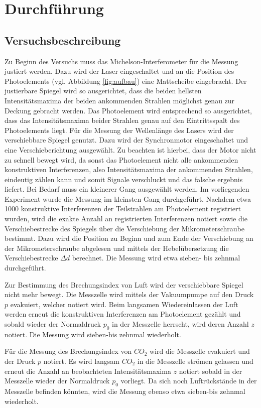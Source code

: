 \section{Durchführung}
\label{sec:Durchführung}



\subsection{Versuchsbeschreibung}
\label{sec:Versuchsbeschreibung}
Zu Beginn des Versuchs muss das Michelson-Interferometer für die Messung justiert werden.
Dazu wird der Laser eingeschaltet und an die Position des Photoelements (vgl. Abbildung \ref{fig:aufbau}) eine Mattscheibe eingebracht.
Der justierbare Spiegel wird so ausgerichtet, dass die beiden hellsten Intensitätsmaxima der beiden ankommenden Strahlen möglichst genau zur Deckung gebracht werden. Das Photoelement wird entsprechend so ausgerichtet, dass das Intensitätsmaxima beider Strahlen genau auf den Eintrittsspalt des Photoelements liegt.
Für die Messung der Wellenlänge des Lasers wird der verschiebbare Spiegel genutzt.
Dazu wird der Synchronmotor eingeschaltet und eine Verschieberichtung ausgewählt.
Zu beachten ist hierbei, dass der Motor nicht zu schnell bewegt wird, da sonst das Photoelement nicht alle ankommenden konstruktiven Interferenzen, also Intensitätsmaxima der ankommenden Strahlen, eindeutig zählen kann und somit Signale verschluckt und das falsche ergebnis liefert.
Bei Bedarf muss ein kleinerer Gang ausgewählt werden. Im vorliegenden Experiment wurde die Messung im kleinsten Gang durchgeführt.
Nachdem etwa 1000 konstruktive Interferenzen der Teilstrahlen am Photoelement registriert wurden, wird die exakte Anzahl an registrierten Interferenzen notiert sowie die Verschiebestrecke des Spiegels über die Verschiebung der Mikrometerschraube bestimmt. Dazu wird die Position zu Beginn und zum Ende der Verschiebung an der Mikrometerschraube abgelesen und mittels der Hebelübersetzung die Verschiebestrecke $\Delta d$ berechnet.
Die Messung wird etwa sieben- bis zehnmal durchgeführt.

Zur Bestimmung des Brechungsindex von Luft wird der verschiebbare Spiegel nicht mehr bewegt.
Die Messzelle wird mittels der Vakuumpumpe auf den Druck $p$ evakuiert, welcher notiert wird. Beim langsamen Wiedereinlassen der Luft werden erneut die konstruktiven Interferenzen am Photoelement gezählt und sobald wieder der Normaldruck $p_{\mathrm{0}}$ in der Messzelle herrscht, wird deren Anzahl $z$ notiert. Die Messung wird sieben-bis zehnmal wiederholt.

Für die Messung des Brechungsindex von $CO_2$ wird die Messzelle evakuiert und der Druck $p$ notiert.
Es wird langsam $CO_2$ in die Messzelle strömen gelassen und erneut die Anzahl an beobachteten Intensitätsmaxima $z$ notiert sobald in der Messzelle wieder der Normaldruck $p_0$ vorliegt.
Da sich noch Luftrückstände in der Messzelle befinden könnten, wird die Messung ebenso etwa sieben-bis zehnmal wiederholt.
